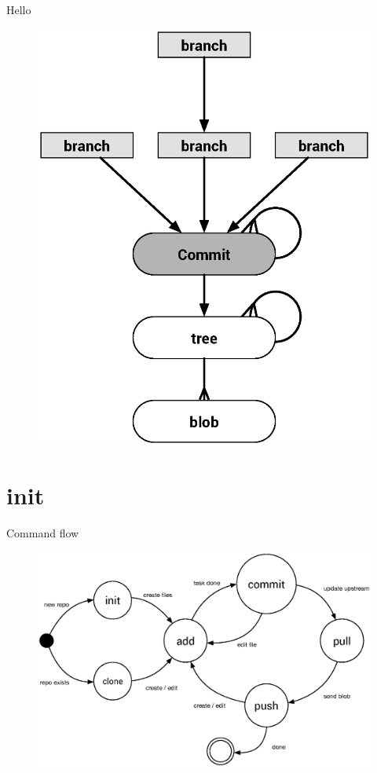 \documentclass{beamer}
\begin{document}
\begin{frame}{Hello}
    \begin{figure}
        \center
        \includegraphics[height=.8\textheight]{git-action}
        \label{fig:git-action}
    \end{figure}
\end{frame}

\section{init}
\begin{frame}{Command flow}
    \begin{figure}
        \center
        \includegraphics[width=.9\textwidth]{git-command-flow}
        \label{fig:git-action}
    \end{figure}
\end{frame}
\end{document}
